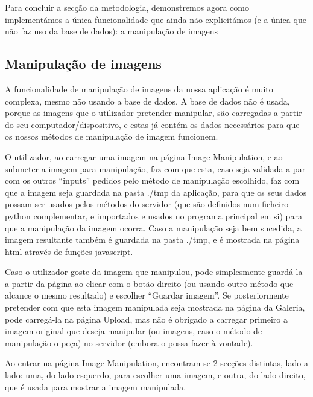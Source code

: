 \documentclass{report}
\begin{document}
 \linebreak
 \bigskip
 \bigskip
 \bigskip
 Para concluir a secção da metodologia, demonstremos agora como implementámos a única funcionalidade que ainda não explicitámos (e a única que não faz uso da base de dados): a manipulação de imagens

 \newpage
\subsection{Manipulação de imagens}

A funcionalidade de manipulação de imagens da nossa aplicação é muito complexa, mesmo não usando a base de dados. A base de dados não é usada, porque as imagens que o utilizador pretender manipular, são carregadas a partir do seu computador/dispositivo, e estas já contém os dados necessários para que os nossos métodos de manipulação de imagem funcionem.

\linebreak
 \bigskip

 
	O utilizador, ao carregar uma imagem na página Image Manipulation, e ao submeter a imagem para manipulação, faz com que esta, caso seja validada a par com os outros “inputs” pedidos pelo método de manipulação escolhido, faz com que a imagem seja guardada na pasta ./tmp da aplicação, para que os seus dados possam ser usados pelos métodos do servidor (que são definidos num ficheiro python complementar, e importados e usados no programa principal em si) para que a manipulação da imagem ocorra. Caso a manipulação seja bem sucedida, a imagem resultante também é guardada na pasta ./tmp, e é mostrada na página html através de funções javascript.

 \linebreak
 \bigskip
 
	Caso o utilizador goste da imagem que manipulou, pode simplesmente guardá-la a partir da página ao clicar com o botão direito (ou usando outro método que alcance o mesmo resultado) e escolher “Guardar imagem”. Se posteriormente pretender com que esta imagem manipulada seja mostrada na página da Galeria, pode carregá-la na página Upload, mas não é obrigado a carregar primeiro a imagem original que deseja manipular (ou imagens, caso o método de manipulação o peça) no servidor (embora o possa fazer à vontade).

 \linebreak
 \bigskip
 
	Ao entrar na página Image Manipulation, encontram-se 2 secções distintas, lado a lado: uma, do lado esquerdo, para escolher uma imagem, e outra, do lado direito, que é usada para mostrar a imagem manipulada.
\end{document}
